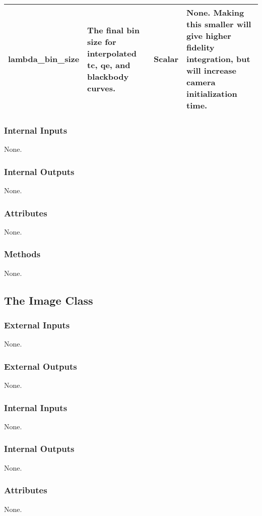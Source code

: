 \documentclass[]{DINOReportMemo}
\begin{document}
\begin{table}[]
\begin{tabular}{|l|l|l|l|}
lambda\_bin\_size & The final bin size for interpolated tc, qe, and blackbody curves.                                      & Scalar                                    & None. Making this smaller will give higher fidelity integration, but will increase camera initialization time.                                                                                                                                                                                                \\ \hline
\end{tabular}
\end{table}
\subsubsection{Internal Inputs}
None.
\subsubsection{Internal Outputs}
None.
\subsubsection{Attributes}
None.
\subsubsection{Methods}
None.

\subsection{The Image Class}
\subsubsection{External Inputs}
None.
\subsubsection{External Outputs}
None.
\subsubsection{Internal Inputs}
None.
\subsubsection{Internal Outputs}
None.
\subsubsection{Attributes}
None.
\end{document}
